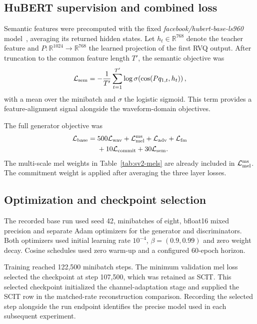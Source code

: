 \subsection{HuBERT supervision and combined loss}
Semantic features were precomputed with the fixed \textit{facebook/hubert-base-ls960} model~\cite{hubert}, averaging its returned hidden states. Let $h_t\in\mathbb{R}^{768}$ denote the teacher feature and $P:\mathbb{R}^{1024}\rightarrow\mathbb{R}^{768}$ the learned projection of the first RVQ output. After truncation to the common feature length $T'$, the semantic objective was
\begin{equation}
 \mathcal L_{\rm sem}
 =-\frac{1}{T'}\sum_{t=1}^{T'}
       \log\sigma\!\left(\cos(Pq_{1,t},h_t)\right),
 \label{eq:sv2-sem}
\end{equation}
with a mean over the minibatch and $\sigma$ the logistic sigmoid. This term provides a feature-alignment signal alongside the waveform-domain objectives.

The full generator objective was
\begin{equation}
\begin{split}
 \mathcal L_{\rm base}={}&
 500\mathcal L_{\rm wav}
 +\mathcal L_{\rm mel}^{\rm ms}
 +\mathcal L_{\rm adv}+\mathcal L_{\rm fm}\\
 &+10\mathcal L_{\rm commit}+30\mathcal L_{\rm sem}.
\end{split}
\label{eq:sv2-base}
\end{equation}
The multi-scale mel weights in Table~\ref{tab:sv2-mels} are already included in $\mathcal L_{\rm mel}^{\rm ms}$. The commitment weight is applied after averaging the three layer losses.

\subsection{Optimization and checkpoint selection}
The recorded base run used seed 42, minibatches of eight, bfloat16 mixed precision and separate Adam optimizers for the generator and discriminators. Both optimizers used initial learning rate $10^{-4}$, $\beta=(0.9,0.99)$ and zero weight decay. Cosine schedules used zero warm-up and a configured 60-epoch horizon.

Training reached 122,500 minibatch steps. The minimum validation mel loss selected the checkpoint at step 107,500, which was retained as SCIT. This selected checkpoint initialized the channel-adaptation stage and supplied the SCIT row in the matched-rate reconstruction comparison. Recording the selected step alongside the run endpoint identifies the precise model used in each subsequent experiment.

